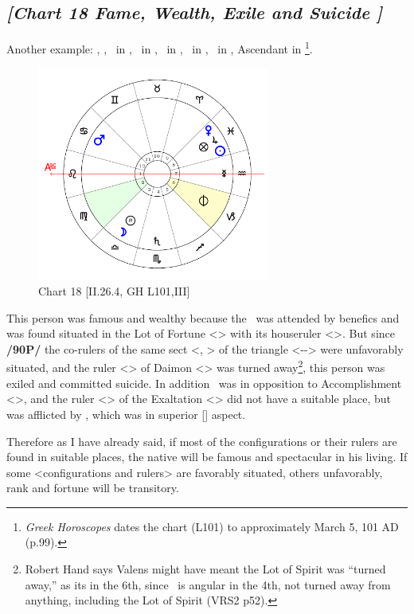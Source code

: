 \newpage
\subsection*{\textit{[Chart 18 Fame, Wealth, Exile and Suicide ]}}

Another example: \Sun, \Jupiter, \Venus\, in \Pisces, \Moon\, in \Libra, \Mars\, in \Cancer, \Mercury\, in \Aquarius, \Saturn\, in \Scorpio, Ascendant in \Leo
\footnote{\textit{Greek Horoscopes} dates the chart (L101) to approximately March 5, 101 AD (p.99).}.

\clearpage
\begin{figure}
\centering

\includegraphics[width=0.68\textwidth]{charts/2_26_4}
\caption{Chart 18 [II.26.4, GH L101,III]}
\label{fig:chart18}
\end{figure}


This person was famous and wealthy because the \Sun\, was attended by benefics and was found situated in the Lot of Fortune <\Pisces> with its houseruler <\Jupiter>. But since \textbf{/90P/} the co-rulers of the same sect <\Mars, \Moon> of the triangle <\Pisces-\Cancer-\Scorpio> were
unfavorably situated, and the ruler <\Saturn> of Daimon <\Capricorn> was turned away\footnote{Robert Hand says Valens might have meant the Lot of Spirit was ``turned away,'' as its in the 6th, since \Saturn\, is angular in the 4th, not turned away from anything, including the Lot of Spirit (VRS2 p52).}, this person was exiled and committed suicide. In addition \Mars\, was in opposition to Accomplishment <\Capricorn>, and the ruler <\Mercury> of the Exaltation <\Virgo> did not have a suitable place, but was afflicted by \Saturn, which was in superior [\Square] aspect.

Therefore \mndl as I have already said, if most of the configurations or their rulers are found in suitable places,
the native will be famous and spectacular in his living. If some <configurations and rulers> are favorably
situated, others unfavorably, rank and fortune will be transitory.

\newpage